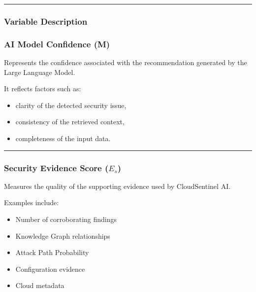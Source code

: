 \begin{center}\rule{0.5\linewidth}{0.5pt}\end{center}

\subsubsection{Variable Description}

\subsubsection{\texorpdfstring{\textbf{AI Model Confidence (M)}}{AI Model Confidence (M)}}

Represents the confidence associated with the recommendation generated by the Large Language Model.

It reflects factors such as:

\begin{itemize}
\tightlist
\item
  clarity of the detected security issue,\\
\item
  consistency of the retrieved context,\\
\item
  completeness of the input data.
\end{itemize}

\begin{center}\rule{0.5\linewidth}{0.5pt}\end{center}

\subsubsection{\texorpdfstring{\textbf{Security Evidence Score ($E_s$)}}{Security Evidence Score ($E_s$)}}

Measures the quality of the supporting evidence used by CloudSentinel AI.

Examples include:

\begin{itemize}
\tightlist
\item
  Number of corroborating findings\\
\item
  Knowledge Graph relationships\\
\item
  Attack Path Probability\\
\item
  Configuration evidence\\
\item
  Cloud metadata
\end{itemize}


